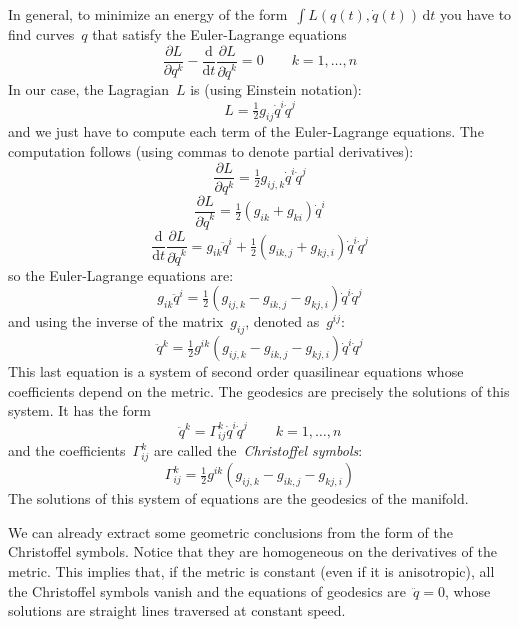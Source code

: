 In general, to minimize an energy of the form~$\int L(q(t),\dot
q(t))\,\mathrm{d} t$ you have to find curves~$q$ that satisfy
the Euler-Lagrange equations
$$
\frac{\partial L}{\partial q^k}
-\frac{\mathrm{d}}{\mathrm{d} t}
\frac{\partial L}{\partial \dot q^k}
= 0
\qquad k=1,\ldots,n
$$
In our case, the Lagragian~$L$ is (using Einstein notation):
$$
L=
\tfrac{1}{2}
g_{ij}\dot q^i\dot q^j
$$
and we just have to compute each term of the Euler-Lagrange equations.
The computation follows (using commas to denote partial derivatives):
$$
\frac{\partial L}{\partial q^k}
=
\tfrac{1}{2}
g_{ij,k}\dot q^i\dot q^j
$$
$$
\frac{\partial L}{\partial \dot q^k}
=
\tfrac{1}{2}\left(g_{ik}+g_{ki}\right)\dot q^i
$$
$$
\frac{\mathrm{d}}{\mathrm{d} t}
\frac{\partial L}{\partial \dot q^k}
=
g_{ik}\ddot q^i
+
\tfrac{1}{2}\left(g_{ik,j}+g_{kj,i}\right)\dot q^i\dot q^j
$$
so the Euler-Lagrange equations are:
$$
g_{ik}\ddot q^i
=
\tfrac{1}{2}
\left(
g_{ij,k}-g_{ik,j}-g_{kj,i}
\right)
\dot q^i\dot q^j
$$
and using the inverse of the matrix~$g_{ij}$, denoted as~$g^{ij}$:
$$
\ddot q^k
=
\tfrac{1}{2}
g^{ik}
\left(
g_{ij,k}-g_{ik,j}-g_{kj,i}
\right)
\dot q^i\dot q^j
$$
This last equation is a system of second order quasilinear equations whose
coefficients depend on the metric.  The geodesics are precisely the solutions
of this system.  It has the form
$$
\ddot q^k = \Gamma^k_{ij}\dot q^i\dot q^j
\qquad k=1,\ldots, n
$$
and the coefficients~$\Gamma^k_{ij}$ are called the~\emph{Christoffel symbols}:
$$
\Gamma^k_{ij} =
\tfrac{1}{2}
g^{ik}
\left(
g_{ij,k}-g_{ik,j}-g_{kj,i}
\right)
$$
The solutions of this system of equations are the geodesics of the manifold.

We can already extract some geometric conclusions from the form of the
Christoffel symbols.  Notice that they are homogeneous on the derivatives of
the metric.  This implies that, if the metric is constant (even if it is
anisotropic), all the Christoffel symbols vanish and the equations of
geodesics are~$\ddot q=0$, whose solutions are straight lines traversed at
constant speed.

